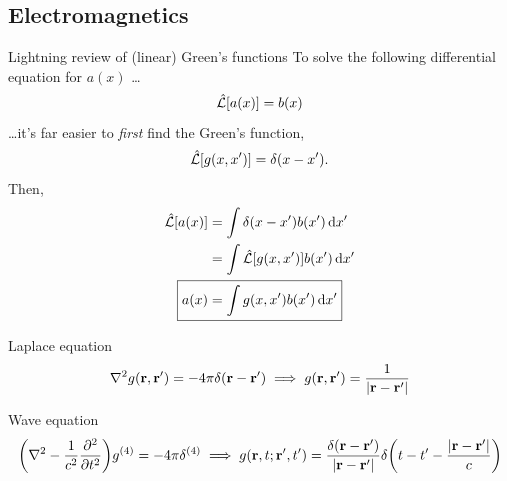 \documentclass[aspectratio=169]{beamer}
\begin{document}
\subsection{Electromagnetics}

\begin{frame}{Lightning review of (linear) Green's functions}
  To solve the following differential equation for $a(x)$ \ldots
  \begin{equation*}
    \hat{\mathcal{L}}\qty[a(x)] = b(x)
  \end{equation*}
  \ldots it's far easier to \emph{first} find the Green's function,
  \begin{equation*}
    \hat{\mathcal{L}}\qty[g(x, x')] = \delta(x - x').
  \end{equation*}
  Then,
  \begin{align*}
    \hat{\mathcal{L}}\qty[a(x)] &= \int \delta(x - x') b(x') \dd{x'} \\
                                &= \int \hat{\mathcal{L}}\qty[g(x, x')] b(x') \dd{x'} \\
                   \Aboxed{a(x) &= \int g(x, x') b(x') \dd{x'}}
  \end{align*}
\end{frame}

\begin{frame}
  \begin{block}{Laplace equation}
    \begin{equation*}
      \laplacian g(\vb{r}, \vb{r}') = -4 \pi \delta(\vb{r} - \vb{r}') \implies g(\vb{r}, \vb{r}') = \frac{1}{\abs{\vb{r} - \vb{r}'}}
    \end{equation*}
  \end{block}

  \begin{block}{Wave equation}
    \begin{equation*}
      \qty(\laplacian - \frac{1}{c^2}\pdv[2]{t}) g^{(4)} = -4 \pi \delta^{(4)} \implies g(\vb{r}, t; \vb{r}', t') = \frac{\delta(\vb{r} - \vb{r}')}{\abs{\vb{r} - \vb{r}'}} \delta\qty(t - t' - \frac{\abs{\vb{r} - \vb{r}'}}{c})
    \end{equation*}
  \end{block}
\end{frame}
\end{document}
